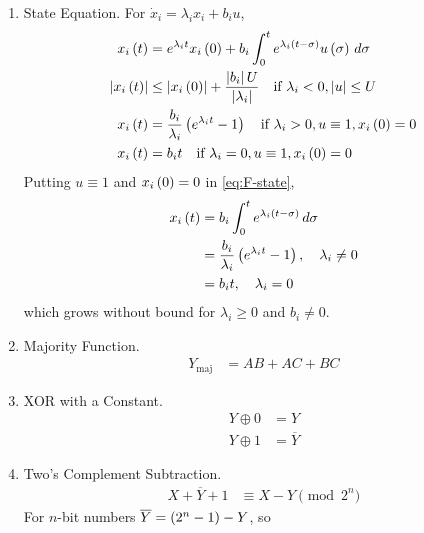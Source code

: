 \begin{enumerate}[label=\thesubsection.\arabic*, ref=\thesubsection.\theenumi]
\begin{align}
T &= \frac{\sum_{k} P_k \Delta_k}{\Delta}
\label{eq:F-mason}
\\
\Delta &= 1 - \sum_{i} L_i + \cdots
\end{align}
where $P_k$ are the forward-path gains, $L_i$ the loop gains and $\Delta_k$ is $\Delta$ with the loops touching path $k$ removed.
\item State Equation. For $\dot{x}_i = \lambda_i x_i + b_i u$,
\begin{align}
x_i\left(t\right) &= e^{\lambda_i t} x_i\left(0\right) + b_i \int_{0}^{t} e^{\lambda_i \left(t - \sigma\right)} u\left(\sigma\right) \,d\sigma
\label{eq:F-state}
\\
\left\vert x_i\left(t\right)\right\vert &\le \left\vert x_i\left(0\right)\right\vert + \frac{\left\vert b_i\right\vert U}{\left\vert\lambda_i\right\vert} \quad \text{if } \lambda_i < 0, \left\vert u\right\vert \le U
\label{eq:F-state-bounded}
\\
x_i\left(t\right) &= \frac{b_i}{\lambda_i}\left(e^{\lambda_i t} - 1\right) \quad \text{if } \lambda_i > 0, u \equiv 1, x_i\left(0\right) = 0
\label{eq:F-state-unbounded}
\\
x_i\left(t\right) &= b_i t \quad \text{if } \lambda_i = 0, u \equiv 1, x_i\left(0\right) = 0
\label{eq:F-state-integrator}
\end{align}
\solution Putting $u \equiv 1$ and $x_i\left(0\right) = 0$ in \eqref{eq:F-state},
\begin{align}
x_i\left(t\right) &= b_i \int_{0}^{t} e^{\lambda_i \left(t - \sigma\right)} \,d\sigma
\\
&= \frac{b_i}{\lambda_i}\left(e^{\lambda_i t} - 1\right), \quad \lambda_i \ne 0
\\
&= b_i t, \quad \lambda_i = 0
\end{align}
which grows without bound for $\lambda_i \ge 0$ and $b_i \ne 0$.
\item Majority Function.
\begin{align}
Y_{\mathrm{maj}} &= AB + AC + BC
\label{eq:F-maj}
\end{align}
\item XOR with a Constant.
\begin{align}
Y \oplus 0 &= Y
\\
Y \oplus 1 &= \overline{Y}
\label{eq:F-xor}
\end{align}
\item Two's Complement Subtraction.
\begin{align}
X + \overline{Y} + 1 &\equiv X - Y \pmod{2^n}
\label{eq:F-twos}
\end{align}
\solution For $n$-bit numbers $\overline{Y} = \left(2^n - 1\right) - Y$, so
\begin{align}

\end{align}
\end{enumerate}
